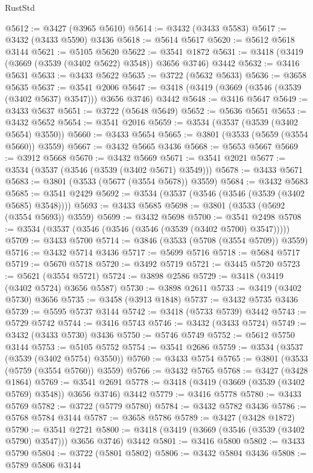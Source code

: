\begin{lexlean}{RustStd}
\begin{coremodule}
@5612 := @3427 (@3965 @5610)
@5614 := @3432 (@3433 @5583)
@5617 := @3432 (@3433 @5590) @3436
@5618 := @5614 @5617
@5620 := @5612 @5618 @3144
@5621 := @5105 @5620
@5622 := @3541 @1872
@5631 := @3418 (@3419 (@3669 (@3539 (@3402 @5622) @3548)) @3656 @3746) @3442
@5632 := @3416 @5631
@5633 := @3433 @5622
@5635 := @3722 (@5632 @5633)
@5636 := @3658 @5635
@5637 := @3541 @2006
@5647 := @3418 (@3419 (@3669 (@3546 (@3539 (@3402 @5637) @3547))) @3656 @3746) @3442
@5648 := @3416 @5647
@5649 := @3433 @5637
@5651 := @3722 (@5648 @5649)
@5652 := @5636 @5651
@5653 := @3432 @5652
@5654 := @3541 @2016
@5659 := @3534 (@3537 (@3539 (@3402 @5654) @3550))
@5660 := @3433 @5654
@5665 := @3801 (@3533 (@5659 (@3554 @5660)) @3559)
@5667 := @3432 @5665 @3436
@5668 := @5653 @5667
@5669 := @3912 @5668
@5670 := @3432 @5669
@5671 := @3541 @2021
@5677 := @3534 (@3537 (@3546 (@3539 (@3402 @5671) @3549)))
@5678 := @3433 @5671
@5683 := @3801 (@3533 (@5677 (@3554 @5678)) @3559)
@5684 := @3432 @5683
@5685 := @3541 @2429
@5692 := @3534 (@3537 (@3546 (@3546 (@3539 (@3402 @5685) @3548))))
@5693 := @3433 @5685
@5698 := @3801 (@3533 (@5692 (@3554 @5693)) @3559)
@5699 := @3432 @5698
@5700 := @3541 @2498
@5708 := @3534 (@3537 (@3546 (@3546 (@3546 (@3539 (@3402 @5700) @3547)))))
@5709 := @3433 @5700
@5714 := @3846 (@3533 (@5708 (@3554 @5709)) @3559)
@5716 := @3432 @5714 @3436
@5717 := @5699 @5716
@5718 := @5684 @5717
@5719 := @5670 @5718
@5720 := @3492 @5719
@5721 := @3445 @5720
@5723 := @5621 (@3554 @5721)
@5724 := @3898 @2586
@5729 := @3418 (@3419 (@3402 @5724) @3656 @5587)
@5730 := @3898 @2611
@5733 := @3419 (@3402 @5730) @3656
@5735 := @3458 (@3913 @1848)
@5737 := @3432 @5735 @3436
@5739 := @5595 @5737 @3144
@5742 := @3418 (@5733 @5739) @3442
@5743 := @5729 @5742
@5744 := @3416 @5743
@5746 := @3432 (@3433 @5724)
@5749 := @3432 (@3433 @5730) @3436
@5750 := @5746 @5749
@5752 := @5612 @5750 @3144
@5753 := @5105 @5752
@5754 := @3541 @2686
@5759 := @3534 (@3537 (@3539 (@3402 @5754) @3550))
@5760 := @3433 @5754
@5765 := @3801 (@3533 (@5759 (@3554 @5760)) @3559)
@5766 := @3432 @5765
@5768 := @3427 (@3428 @1864)
@5769 := @3541 @2691
@5778 := @3418 (@3419 (@3669 (@3539 (@3402 @5769) @3548)) @3656 @3746) @3442
@5779 := @3416 @5778
@5780 := @3433 @5769
@5782 := @3722 (@5779 @5780)
@5784 := @3432 @5782 @3436
@5786 := @5768 @5784 @3144
@5787 := @3658 @5786
@5789 := @3427 (@3428 @1872)
@5790 := @3541 @2721
@5800 := @3418 (@3419 (@3669 (@3546 (@3539 (@3402 @5790) @3547))) @3656 @3746) @3442
@5801 := @3416 @5800
@5802 := @3433 @5790
@5804 := @3722 (@5801 @5802)
@5806 := @3432 @5804 @3436
@5808 := @5789 @5806 @3144

\end{coremodule}
\end{lexlean}

